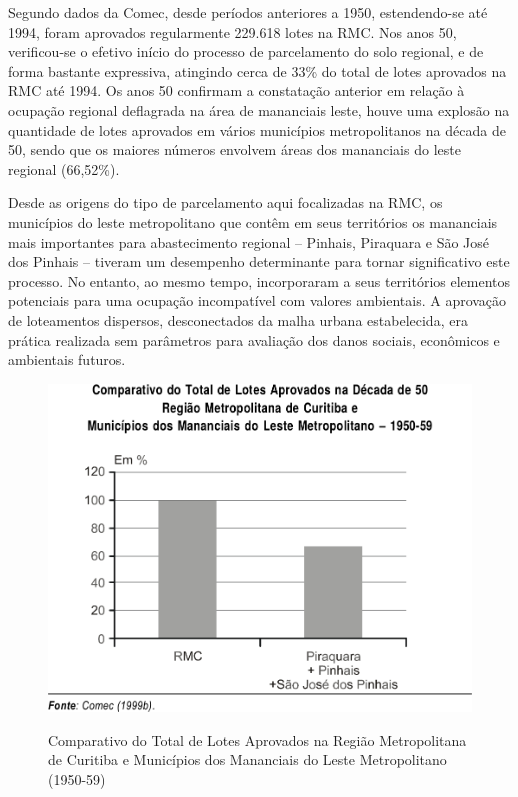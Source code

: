 	Segundo dados da Comec, desde períodos anteriores a 1950, estendendo-se até 1994, foram aprovados regularmente 229.618 lotes na RMC. Nos anos 50, verificou-se o efetivo início do processo de parcelamento do solo regional, e de forma bastante expressiva, atingindo cerca de 33\% do total de lotes aprovados na RMC até 1994. Os anos 50 confirmam a constatação anterior em relação à ocupação regional deflagrada na área de mananciais leste,  houve uma explosão na quantidade de lotes aprovados em vários municípios metropolitanos na década de 50, sendo que os maiores números envolvem áreas dos mananciais do leste regional (66,52\%).
	
	Desde as origens do tipo de parcelamento aqui focalizadas na RMC, os municípios do leste metropolitano que contêm em seus territórios os mananciais mais importantes para abastecimento regional – Pinhais, Piraquara e São José dos Pinhais – tiveram um desempenho determinante para tornar significativo este processo. No entanto, ao mesmo tempo, incorporaram a seus territórios elementos potenciais para uma ocupação incompatível com valores ambientais. A aprovação de loteamentos dispersos, desconectados da malha urbana estabelecida, era prática realizada sem parâmetros para avaliação dos danos sociais, econômicos e ambientais futuros.
	
	\begin{figure}
		\centering
		\caption{Comparativo do Total de Lotes Aprovados na Região Metropolitana de Curitiba e Municípios dos Mananciais do Leste Metropolitano (1950-59)}
		\includegraphics[width=1.0\linewidth]{img/lima2001a_01}
		\label{fig:lima2001a_01}
	\end{figure}

